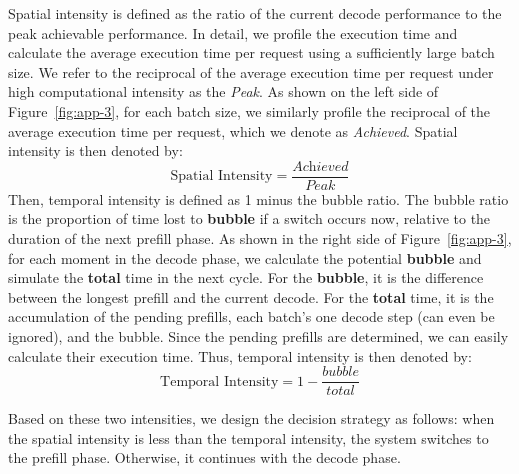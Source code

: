 Spatial intensity is defined as the ratio of the current decode performance to the peak achievable performance.  In detail, we profile the execution time and calculate the average execution time per request using a sufficiently large batch size.
We refer to the reciprocal of the average execution time per request under high computational intensity as the \textit{Peak}. As shown on the left side of Figure~\ref{fig:app-3}, for each batch size, we similarly profile the reciprocal of the average execution time per request, which we denote as \textit{Achieved}. Spatial intensity is then  denoted by:
\vspace{-2pt}
\begin{equation}
\text{Spatial Intensity} = \frac{\textit{Achieved}}{\textit{Peak}}
\end{equation}
Then, temporal intensity is defined as 1 minus the bubble ratio.
The bubble ratio is the proportion of time lost to \textbf{bubble} if a switch occurs now, relative to the duration of the next prefill phase.
As shown in the right side of Figure~\ref{fig:app-3}, for each moment in the decode phase, we calculate the potential \textbf{bubble} and simulate the \textbf{total} time in the next cycle.
For the \textbf{bubble}, it is the difference between the longest prefill and the current decode.
For the \textbf{total} time, it is the accumulation of the pending prefills, each batch's one decode step (can even be ignored), and the bubble.
Since the pending prefills are determined, we can easily calculate their execution time.
Thus, temporal intensity is then denoted by:
\vspace{-2pt}
\begin{equation}
\text{Temporal Intensity} = 1 - \frac{\textit{bubble}}{\textit{total}}
\end{equation}

Based on these two intensities, we design the decision strategy as follows: when the spatial intensity is less than the temporal intensity, the system switches to the prefill phase. Otherwise, it continues with the decode phase.

